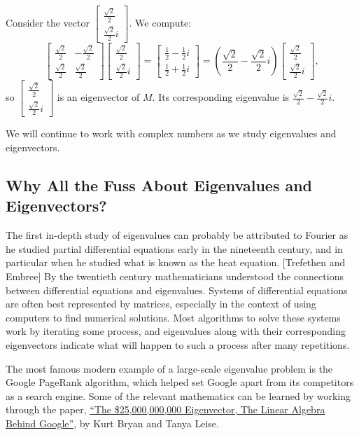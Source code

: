 \documentclass{ximera}
\begin{document}
\begin{example}
Consider the vector $\begin{bmatrix} \frac{\sqrt{2}}{2}\\ \frac{\sqrt{2}}{2} i \end{bmatrix}$.  We compute:
$$\begin{bmatrix}
\frac{\sqrt{2}}{2} & -\frac{\sqrt{2}}{2}\\
\frac{\sqrt{2}}{2} & \frac{\sqrt{2}}{2}
\end{bmatrix} \begin{bmatrix} \frac{\sqrt{2}}{2}\\ \frac{\sqrt{2}}{2} i \end{bmatrix} =
\begin{bmatrix} \frac{1}{2}-\frac{1}{2} i\\ \frac{1}{2}+ \frac{1}{2} i \end{bmatrix}= (\frac{\sqrt{2}}{2}-\frac{\sqrt{2}}{2}i) \begin{bmatrix} \frac{\sqrt{2}}{2}\\ \frac{\sqrt{2}}{2} i \end{bmatrix},$$
so $\begin{bmatrix} \frac{\sqrt{2}}{2}\\ \frac{\sqrt{2}}{2} i \end{bmatrix}$ is an eigenvector of $M$.  Its corresponding eigenvalue is $\frac{\sqrt{2}}{2}-\frac{\sqrt{2}}{2}i$.
\end{example}

We will continue to work with complex numbers as we study eigenvalues and eigenvectors.

\subsection*{Why All the Fuss About Eigenvalues and Eigenvectors?}

\begin{remark}
The first in-depth study of eigenvalues can probably be attributed to Fourier as he studied partial differential equations early in the nineteenth century, and in particular when he studied what is known as the heat equation. [Trefethen and  Embree]  By the twentieth century mathematicians understood the connections between differential equations and eigenvalues. Systems of differential equations are often best represented by matrices, especially in the context of using computers to find numerical solutions. Most algorithms to solve these systems work by iterating some process, and eigenvalues along with their corresponding eigenvectors indicate what will happen to such a process after many repetitions.

The most famous modern example of a large-scale eigenvalue problem is the Google PageRank algorithm, which helped set Google apart from its competitors as a search engine.  Some of the relevant mathematics can be learned by working through the paper, \href{https://doi.org/10.1137/050623280}{``The \$25,000,000,000 Eigenvector, The Linear Algebra Behind Google''}, by Kurt Bryan and Tanya Leise.  
\end{remark}
\end{document}
